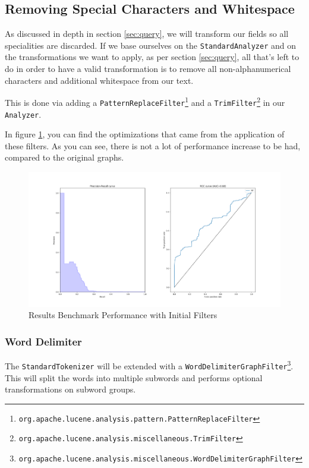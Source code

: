 \documentclass[11pt]{article}
\begin{document}
\subsection{Removing Special Characters and Whitespace}
As discussed in depth in section \ref{sec:query}, we will transform our fields so all specialities are discarded. If we base ourselves on the \texttt{StandardAnalyzer} and on the transformations we want to apply, as per section \ref{sec:query}, all that's left to do in order to have a valid transformation is to remove all non-alphanumerical characters and additional whitespace from our text.

This is done via adding a \texttt{PatternReplaceFilter}\footnote{\texttt{org.apache.lucene.analysis.pattern.PatternReplaceFilter}} and a \texttt{TrimFilter}\footnote{\texttt{org.apache.lucene.analysis.miscellaneous.TrimFilter}} in our \texttt{Analyzer}.

In figure \ref{fig:alphanumeric}, you can find the optimizations that came from the application of these filters. As you can see, there is not a lot of performance increase to be had, compared to the original graphs.
\begin{figure}[h!]
    \centering
    \includegraphics[width=\textwidth]{images/customAna-trim}
    \caption{Results Benchmark Performance with Initial Filters}
    \label{fig:alphanumeric}
\end{figure}

\subsubsection{Word Delimiter}\label{sec:word-delimiter}
The \texttt{StandardTokenizer} will be extended with a \texttt{WordDelimiterGraphFilter}\footnote{\texttt{org.apache.lucene.analysis.miscellaneous.WordDelimiterGraphFilter}}. This will split the words into multiple subwords and performs optional transformations on subword groups. \cite{lucene}
\end{document}
